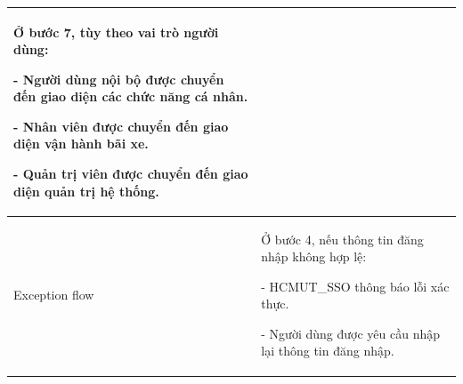 \begin{center}
\begin{tabular}{|m{2.5cm}|m{13cm}|}
        Ở bước 7, tùy theo vai trò người dùng:
        
        - Người dùng nội bộ được chuyển đến giao diện các chức năng cá nhân.
        
        - Nhân viên được chuyển đến giao diện vận hành bãi xe.
        
        - Quản trị viên được chuyển đến giao diện quản trị hệ thống.\\ 
    \hline
        Exception flow & 
        Ở bước 4, nếu thông tin đăng nhập không hợp lệ:
        
        - HCMUT\_SSO thông báo lỗi xác thực.
        
        - Người dùng được yêu cầu nhập lại thông tin đăng nhập.\\
    \hline
    \end{tabular}
\end{center}